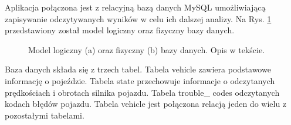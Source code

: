 \documentclass[12pt]{article} %
\numberwithin{equation}{subsection}
\numberwithin{figure}{section}
\numberwithin{table}{section}
\begin{document}
	\hspace{0.5cm}Aplikacja połączona jest z relacyjną bazą danych MySQL umożliwiającą zapisywanie odczytywanych wyników w celu ich dalszej analizy. Na Rys. \ref{rys_database_model} przedstawiony został model logiczny oraz fizyczny bazy danych.
	
		\begin{figure}[!h]
			\centering
			\caption{Model logiczny (a) oraz fizyczny (b) bazy danych. Opis w tekście.}
			\label{rys_database_model}
		\end{figure} 	
	
	Baza danych składa się z trzech tabel. Tabela vehicle zawiera podstawowe informację o pojeździe. Tabela state przechowuje informacje o odczytanych prędkościach i obrotach silnika pojazdu. Tabela trouble\_ codes odczytanych kodach błędów pojazdu. Tabela vehicle jest połączona relacją jeden do wielu z pozostałymi tabelami.
	
\end{document}

